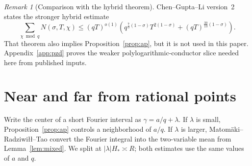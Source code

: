 \documentclass[11pt]{article}
\theoremstyle{remark}
\newtheorem{remark}[theorem]{Remark}
\newcommand{\1}{\mathbf 1}
\begin{document}
\begin{remark}[Comparison with the hybrid theorem]
Chen--Gupta--Li version~2 \cite[Theorem~1.2]{CGL2026} states the stronger
hybrid estimate
\[
 \sum_{\chi\bmod q}N(\sigma,T,\chi)
 \le(qT)^{o(1)}\left(q^{\frac73(1-\sigma)}T^{2(1-\sigma)}
 +(qT)^{\frac{30}{13}(1-\sigma)}\right).
\]
That theorem also implies Proposition~\ref{prop:ap}, but it is not used in
this paper. Appendix~\ref{app:pzd} proves the weaker polylogarithmic-conductor
slice needed here from published inputs.
\end{remark}

\section{Near and far from rational points}
Write the center of a short Fourier interval as
\(\gamma=a/q+\lambda\).  If \(\lambda\) is small,
Proposition~\ref{prop:ap} controls a neighborhood of \(a/q\).  If
\(\lambda\) is larger, Matom\"aki--Radziwi\l\l--Tao convert the Fourier
integral into the two-variable mean from Lemma~\ref{lem:mixed}.  We split at
\(|\lambda|H_*\asymp R\); both estimates use the same values of \(a\) and
\(q\).
\end{document}
